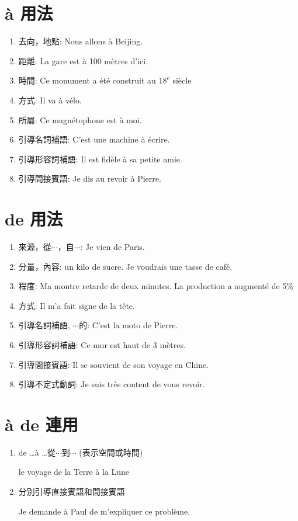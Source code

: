 \documentclass{book}
\begin{document}
    \section{à 用法}
        \begin{enumerate}
            \item 去向，地點: Nous allons à Beijing.
            \item 距離: La gare est à 100 mètres d'ici.
            \item 時間: Ce monument a été construit au $18^{e}$ siècle
            \item 方式: Il va à vélo.
            \item 所屬: Ce magnétophone est à moi.
            \item 引導名詞補語: C'est une machine à écrire.
            \item 引導形容詞補語: Il est fidèle à sa petite amie.
            \item 引導間接賓語: Je dis au revoir à Pierre.
        \end{enumerate}

    \section{de 用法}
        \begin{enumerate}
            \item 來源，從$\cdots$，自$\cdots$: Je vien de Paris.
            \item 分量，內容: un kilo de sucre. Je voudrais une tasse de café.
            \item 程度: Ma montre retarde de deux minutes. La production a augmenté de 5\%
            \item 方式: Il m'a fait signe de la tête.
            \item 引導名詞補語, $\cdots$的: C'est la moto de Pierre.
            \item 引導形容詞補語: Ce mur est haut de 3 mètres.
            \item 引導間接賓語: Il se souvient de son voyage en Chine.
            \item 引導不定式動詞: Je suis très content de vous revoir.
        \end{enumerate}

    \section{à de 連用}
        \begin{enumerate}
            \item de \dots à \dots 從$\cdots$到$\cdots$ (表示空間或時間)
                \begin{center}
                    le voyage de la Terre à la Lune
                \end{center}
            \item 分別引導直接賓語和間接賓語
                \begin{center}
                    Je demande à Paul de m'expliquer ce problème.
                \end{center}
        \end{enumerate}
    
\end{document}
